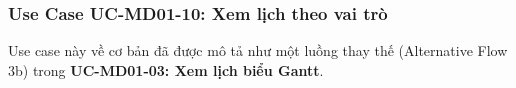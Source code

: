 \subsubsection{Use Case UC-MD01-10: Xem lịch theo vai trò}

Use case này về cơ bản đã được mô tả như một luồng thay thế (Alternative Flow 3b) trong \textbf{UC-MD01-03: Xem lịch biểu Gantt}.
